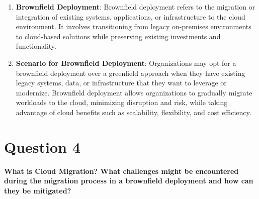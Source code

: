 \documentclass[11pt]{article}
\begin{document}
\begin{enumerate}
    \item \textbf{Brownfield Deployment}: Brownfield deployment refers to the migration or integration of existing systems, applications, or infrastructure to the cloud environment. It involves transitioning from legacy on-premises environments to cloud-based solutions while preserving existing investments and functionality.

    \item \textbf{Scenario for Brownfield Deployment}: Organizations may opt for a brownfield deployment over a greenfield approach when they have existing legacy systems, data, or infrastructure that they want to leverage or modernize. Brownfield deployment allows organizations to gradually migrate workloads to the cloud, minimizing disruption and risk, while taking advantage of cloud benefits such as scalability, flexibility, and cost efficiency.
\end{enumerate}

\section{Question 4}
\textbf{What is Cloud Migration? What challenges might be encountered during the migration process in a brownfield deployment and how can they be mitigated?}
\end{document}
